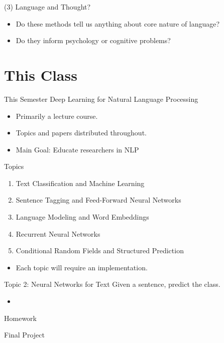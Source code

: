 \documentclass{beamer}
\begin{document}
\begin{frame}{(3) Language and Thought?}
  \begin{itemize}
  \item Do these methods tell us anything about core nature of language?
    \air 

  \item Do they inform psychology or cognitive problems?
  \end{itemize}
\end{frame}

\section{This Class}

\begin{frame}{This Semester}
  Deep Learning for Natural Language Processing

  \begin{itemize}
  \item Primarily a lecture course. 
    \air 

  \item Topics and papers distributed throughout.
    \air

  \item Main Goal: Educate researchers in NLP
  \end{itemize}
\end{frame}

\begin{frame}{Topics}

  \begin{enumerate}
  \item Text Classification and Machine Learning
    \pause
    \air
  \item Sentence Tagging and Feed-Forward Neural Networks
    \pause
    \air 
  \item Language Modeling and Word Embeddings 
    \pause
    \air
  \item Recurrent Neural Networks
    \pause
    \air
  \item Conditional Random Fields and Structured Prediction
  \end{enumerate}


  \begin{itemize}
  \item Each topic will require an implementation.
  \end{itemize}
\end{frame}


\begin{frame}{Topic 2: Neural Networks for Text}
  Given a sentence, predict the class.
  \begin{itemize}
  \item 
  \end{itemize}
\end{frame}

\begin{frame}{Homework}
  
\end{frame}


\begin{frame}{Final Project}
  
\end{frame}
\end{document}
